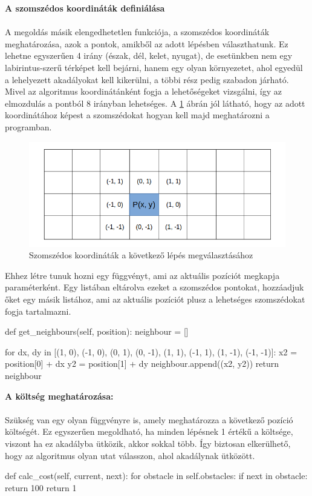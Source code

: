 \newpage

\textbf{A szomszédos koordináták definiálása}
\\\\
A megoldás másik elengedhetetlen funkciója, a szomszédos koordináták meghatározása, azok a pontok, amikből az adott lépésben választhatunk. Ez lehetne egyszerűen 4 irány (észak, dél, kelet, nyugat), de esetünkben nem egy labirintus-szerű térképet kell bejárni, hanem egy olyan környezetet, ahol egyedül a lehelyezett akadályokat kell kikerülni, a többi rész pedig szabadon járható. Mivel az algoritmus koordinátánként fogja a lehetőségeket vizsgálni, így az elmozdulás a pontból 8 irányban lehetséges. A \ref{fig:neighbours} ábrán jól látható, hogy az adott koordinátához képest a szomszédokat hogyan kell majd meghatározni a programban.

\begin{figure}[h!]
\centering
\includegraphics[scale=0.60]{images/neighbours.png}
\caption{Szomszédos koordináták a következő lépés megválasztásához}
\label{fig:neighbours}
\end{figure}

Ehhez létre tunuk hozni egy függvényt, ami az aktuális pozíciót megkapja paraméterként. Egy listában eltárolva ezeket a szomszédos pontokat, hozzáadjuk őket egy másik listához, ami az aktuális pozíciót plusz a lehetséges szomszédokat fogja tartalmazni. 

\begin{python}
	def get_neighbours(self, position):
        neighbour = []

        for dx, dy in [(1, 0), (-1, 0), (0, 1), (0, -1),
                       (1, 1), (-1, 1), (1, -1), (-1, -1)]:
            x2 = position[0] + dx
            y2 = position[1] + dy
            neighbour.append((x2, y2))
        return neighbour 
\end{python}

\bigskip
\bigskip

\textbf{A költség meghatározása:}
\\\\
Szükség van egy olyan függvényre is, amely meghatározza a következő pozíció költségét. Ez egyszerűen megoldható, ha minden lépésnek 1 értékű a költsége, viszont ha ez akadályba ütközik, akkor sokkal több. Így biztosan elkerülhető, hogy az algoritmus olyan utat válasszon, ahol akadálynak ütközött.
\begin{python}
    def calc_cost(self, current, next):
        for obstacle in self.obstacles:
            if next in obstacle:
                return 100
        return 1
\end{python}

